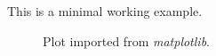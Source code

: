 \documentclass{report}
\begin{document}
    This is a minimal working example.

    \begin{figure}[htbp]
        \centering
        \resizebox{.8\linewidth}{!}{}
        \caption{Plot imported from \emph{matplotlib}.}
    \end{figure}
\end{document}
